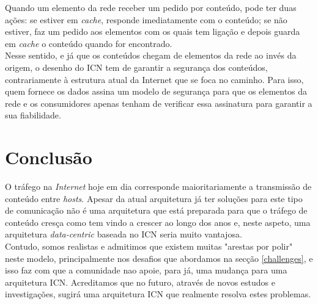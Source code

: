 \documentclass[conference]{IEEEtran}
\begin{document}
Quando um elemento da rede receber um pedido por conte\'{u}do, pode ter duas a\c{c}\~{o}es: se estiver em \textit{cache}, responde imediatamente com o conte\'{u}do; se n\~{a}o estiver, faz um pedido aos elementos com os quais tem liga\c{c}\~{a}o e depois guarda em \textit{cache} o conte\'{u}do quando for encontrado\cite{surveyICN}.\\

Nesse sentido, e j\'{a} que os conte\'{u}dos chegam de elementos da rede ao inv\'{e}s da origem, o desenho do ICN tem de garantir a seguran\c{c}a dos conte\'{u}dos, contrariamente \`{a} estrutura atual da Internet que se foca no caminho. Para isso, quem fornece os dados assina um modelo de seguran\c{c}a para que os elementos da rede e os consumidores apenas tenham de verificar essa assinatura para garantir a sua fiabilidade\cite{icnForest}.\\

\section{Conclus\~{a}o}

O tráfego na \textit{Internet} hoje em dia corresponde maioritariamente a transmissão de conteúdo entre \textit{hosts}. Apesar da atual arquitetura já ter soluções para este tipo de comunicação não é uma arquitetura que está preparada para que o tráfego de conteúdo cresça como tem vindo a crescer ao longo dos anos e, neste aspeto, uma arquitetura \textit{data-centric} baseada no ICN seria muito vantajosa.\\

Contudo, somos realistas e admitimos que existem muitas "arestas por polir" neste modelo, principalmente nos desafios que abordamos na secção \ref{challenges}, e isso faz com que a comunidade nao apoie, para já, uma mudança para uma arquitetura ICN. Acreditamos que no futuro, através de novos estudos e investigações, sugirá uma arquitetura ICN que realmente resolva estes problemas. 



\end{document}
